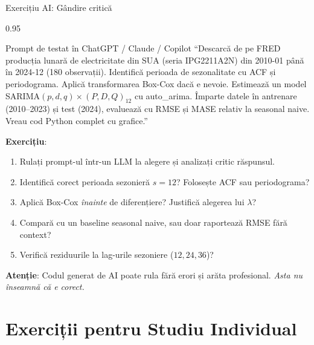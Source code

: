 \documentclass[9pt, aspectratio=169, t]{beamer}
\begin{document}
\begin{frame}{Exercițiu AI: Gândire critică}
    \begin{cminipage}{0.95\textwidth}
    \vspace{-3mm}
    \begin{block}{\footnotesize Prompt de testat în ChatGPT / Claude / Copilot}
        {\footnotesize
        ``Descarcă de pe FRED producția lunară de electricitate din SUA (seria IPG2211A2N) din 2010-01 până în 2024-12 (180 observații). Identifică perioada de sezonalitate cu ACF și periodograma. Aplică transformarea Box-Cox dacă e nevoie. Estimează un model SARIMA$(p,d,q)\times(P,D,Q)_{12}$ cu auto\_arima. Împarte datele în antrenare (2010--2023) și test (2024), evaluează cu RMSE și MASE relativ la seasonal naive. Vreau cod Python complet cu grafice.''
        }
    \end{block}
    \vspace{-2mm}
    {\footnotesize
    \textbf{Exercițiu}:
    \begin{enumerate}\setlength{\itemsep}{0pt}
        \item Rulați prompt-ul într-un LLM la alegere și analizați critic răspunsul.
        \item Identifică corect perioada sezonieră $s=12$? Folosește ACF sau periodograma?
        \item Aplică Box-Cox \textit{înainte} de diferențiere? Justifică alegerea lui $\lambda$?
        \item Compară cu un baseline seasonal naive, sau doar raportează RMSE fără context?
        \item Verifică reziduurile la lag-urile sezoniere ($12, 24, 36$)?
    \end{enumerate}
    }
    \vspace{-2mm}
    \begin{alertblock}{}
        {\footnotesize \textbf{Atenție}: Codul generat de AI poate rula fără erori și arăta profesional. \textit{Asta nu înseamnă că e corect.}}
    \end{alertblock}
    \end{cminipage}
\end{frame}

\section{Exerciții pentru Studiu Individual}
\end{document}
